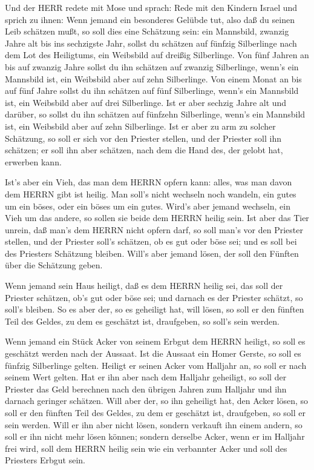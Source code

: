  Und der HERR redete mit Mose und sprach:  Rede
mit den Kindern Israel und sprich zu ihnen: Wenn jemand ein besonderes
Gelübde tut, also daß du seinen Leib schätzen mußt,  so soll
dies eine Schätzung sein: ein Mannsbild, zwanzig Jahre alt bis ins
sechzigste Jahr, sollst du schätzen auf fünfzig Silberlinge nach dem Lot
des Heiligtums,  ein Weibsbild auf dreißig Silberlinge.
 Von fünf Jahren an bis auf zwanzig Jahre sollst du ihn
schätzen auf zwanzig Silberlinge, wenn's ein Mannsbild ist, ein
Weibsbild aber auf zehn Silberlinge.  Von einem Monat an bis
auf fünf Jahre sollst du ihn schätzen auf fünf Silberlinge, wenn's ein
Mannsbild ist, ein Weibsbild aber auf drei Silberlinge.  Ist
er aber sechzig Jahre alt und darüber, so sollst du ihn schätzen auf
fünfzehn Silberlinge, wenn's ein Mannsbild ist, ein Weibsbild aber auf
zehn Silberlinge.  Ist er aber zu arm zu solcher Schätzung,
so soll er sich vor den Priester stellen, und der Priester soll ihn
schätzen; er soll ihn aber schätzen, nach dem die Hand des, der gelobt
hat, erwerben kann.

 Ist's aber ein Vieh, das man dem HERRN opfern kann: alles,
was man davon dem HERRN gibt ist heilig.  Man soll's nicht
wechseln noch wandeln, ein gutes um ein böses, oder ein böses um ein
gutes. Wird's aber jemand wechseln, ein Vieh um das andere, so sollen
sie beide dem HERRN heilig sein.  Ist aber das Tier unrein,
daß man's dem HERRN nicht opfern darf, so soll man's vor den Priester
stellen,  und der Priester soll's schätzen, ob es gut oder
böse sei; und es soll bei des Priesters Schätzung bleiben. 
Will's aber jemand lösen, der soll den Fünften über die Schätzung geben.

 Wenn jemand sein Haus heiligt, daß es dem HERRN heilig
sei, das soll der Priester schätzen, ob's gut oder böse sei; und darnach
es der Priester schätzt, so soll's bleiben.  So es aber
der, so es geheiligt hat, will lösen, so soll er den fünften Teil des
Geldes, zu dem es geschätzt ist, draufgeben, so soll's sein werden.

 Wenn jemand ein Stück Acker von seinem Erbgut dem HERRN
heiligt, so soll es geschätzt werden nach der Aussaat. Ist die Aussaat
ein Homer Gerste, so soll es fünfzig Silberlinge gelten. 
Heiligt er seinen Acker vom Halljahr an, so soll er nach seinem Wert
gelten.  Hat er ihn aber nach dem Halljahr geheiligt, so
soll der Priester das Geld berechnen nach den übrigen Jahren zum
Halljahr und ihn darnach geringer schätzen.  Will aber der,
so ihn geheiligt hat, den Acker lösen, so soll er den fünften Teil des
Geldes, zu dem er geschätzt ist, draufgeben, so soll er sein werden.
 Will er ihn aber nicht lösen, sondern verkauft ihn einem
andern, so soll er ihn nicht mehr lösen können;  sondern
derselbe Acker, wenn er im Halljahr frei wird, soll dem HERRN heilig
sein wie ein verbannter Acker und soll des Priesters Erbgut sein.

